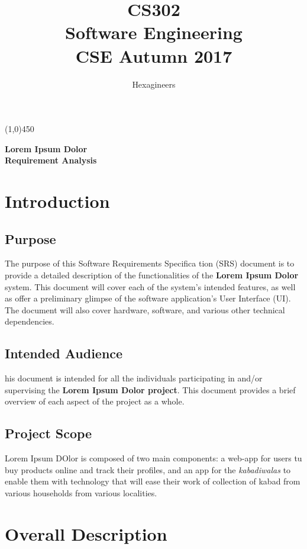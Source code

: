 \documentclass{article}
\title{\textbf{CS302}\\\HUGE Software Engineering\\
\LARGE CSE\hspace{\labelsep}\textbullet\hspace{\labelsep} Autumn 2017
}
\author{Hexagineers}
\begin{document}
\maketitle
\line(1,0){450}

\begin{center}
\textbf{\Huge Lorem Ipsum Dolor\\\Large Requirement Analysis}

\end{center}
\newpage
\tableofcontents
\newpage

\section{Introduction}
\subsection{Purpose}
The  purpose  of  this  Software  Requirements  Specifica
tion  (SRS)  document  is  to  provide  a 
detailed description of the functionalities of the 
\textbf{Lorem Ipsum Dolor} system. This document will cover each of  the  system’s intended  features,  as well  as  offer a  preliminary  glimpse of  the  software 
application’s User Interface (UI). The document will also cover hardware, software, and various other technical dependencies. 

\subsection{Intended Audience} 
\par his  document  is  intended  for  all the individuals  participating  in  and/or supervising  the  \textbf{Lorem Ipsum Dolor project}. 
This document provides a brief overview of each aspect of the project as a whole. 

\subsection{Project Scope}
\par Lorem Ipsum DOlor is composed of two main components: a web-app for users tu buy products online and track their profiles, and an app for the \textit{kabadiwalas} to enable them with technology that will ease their work of collection of kabad from various households from various localities.
\newpage

\section{Overall Description}
\end{document}
